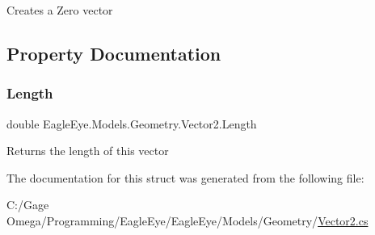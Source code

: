 Creates a Zero vector 



\subsection{Property Documentation}
\mbox{\label{struct_eagle_eye_1_1_models_1_1_geometry_1_1_vector2_ab34c91570ff8b9bd67cec2ddee176893}} 
\subsubsection{\texorpdfstring{Length}{Length}}
{\footnotesize\ttfamily double Eagle\+Eye.\+Models.\+Geometry.\+Vector2.\+Length\hspace{0.3cm}{\ttfamily [get]}}



Returns the length of this vector 



The documentation for this struct was generated from the following file\+:\begin{DoxyCompactItemize}
\item 
C\+:/\+Gage Omega/\+Programming/\+Eagle\+Eye/\+Eagle\+Eye/\+Models/\+Geometry/\mbox{\hyperlink{_models_2_geometry_2_vector2_8cs}{Vector2.\+cs}}\end{DoxyCompactItemize}
